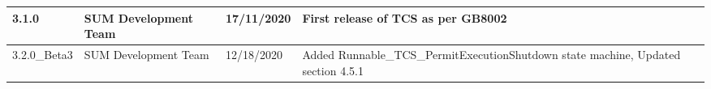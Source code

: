 \begin{longtable}{|l|l|l|l|}
\begin{minipage}{0.14\linewidth}\raggedright\vspace{.75ex}3.1.0\vspace{.75ex}\end{minipage} & \begin{minipage}{0.19\linewidth}\raggedright\vspace{.75ex}SUM Development Team\vspace{.75ex}\end{minipage} & \begin{minipage}{0.12\linewidth}\raggedright\vspace{.75ex}17/11/2020\vspace{.75ex}\end{minipage} & \begin{minipage}{0.43\linewidth}\raggedright\vspace{.75ex}First release of TCS as per GB8002\vspace{.75ex}\end{minipage}\\\hline
\begin{minipage}{0.14\linewidth}\raggedright\vspace{.75ex}3.2.0_Beta3\vspace{.75ex}\end{minipage} & \begin{minipage}{0.19\linewidth}\raggedright\vspace{.75ex}SUM Development Team\vspace{.75ex}\end{minipage} & \begin{minipage}{0.12\linewidth}\raggedright\vspace{.75ex}12/18/2020\vspace{.75ex}\end{minipage} & \begin{minipage}{0.43\linewidth}\raggedright\vspace{.75ex}Added Runnable_TCS_PermitExecutionShutdown state machine, Updated section 4.5.1\vspace{.75ex}\end{minipage}\\\hline

\end{longtable}
